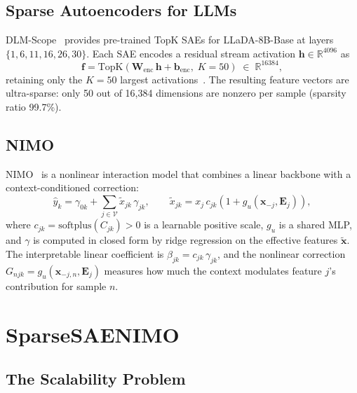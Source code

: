 \documentclass{article}
\newcommand{\bfx}{\mathbf{x}}
\newcommand{\bfh}{\mathbf{h}}
\newcommand{\softplus}{\mathrm{softplus}}
\begin{document}
\subsection{Sparse Autoencoders for LLMs}

DLM-Scope~\citep{dlmscope2024} provides pre-trained TopK SAEs for LLaDA-8B-Base at layers $\{1, 6, 11, 16, 26, 30\}$.
Each SAE encodes a residual stream activation $\bfh \in \mathbb{R}^{4096}$ as
\begin{equation}
    \mathbf{f} = \mathrm{TopK}(\mathbf{W}_{\mathrm{enc}}\,\bfh + \mathbf{b}_{\mathrm{enc}},\;K=50) \;\in\; \mathbb{R}^{16384},
\end{equation}
retaining only the $K = 50$ largest activations~\citep{gao2024scaling}. The resulting feature vectors are ultra-sparse: only 50 out of 16,384 dimensions are nonzero per sample (sparsity ratio 99.7\%).

\subsection{NIMO}

NIMO~\citep{xu2026nimo} is a nonlinear interaction model that combines a linear backbone with a context-conditioned correction:
\begin{equation}
    \hat{y}_k = \gamma_{0k} + \sum_{j \in \mathcal{V}} \tilde{x}_{jk}\,\gamma_{jk},
    \qquad
    \tilde{x}_{jk} = x_j\,c_{jk}\!\left(1 + g_u(\bfx_{-j}, \mathbf{E}_j)\right),
\end{equation}
where $c_{jk} = \softplus(C_{jk}) > 0$ is a learnable positive scale, $g_u$ is a shared MLP, and $\gamma$ is computed in closed form by ridge regression on the effective features $\tilde{\mathbf{x}}$.
The interpretable linear coefficient is $\beta_{jk} = c_{jk}\,\gamma_{jk}$, and the nonlinear correction $G_{njk} = g_u(\bfx_{-j,n}, \mathbf{E}_j)$ measures how much the context modulates feature $j$'s contribution for sample $n$.

\section{SparseSAENIMO}

\subsection{The Scalability Problem}
\end{document}
